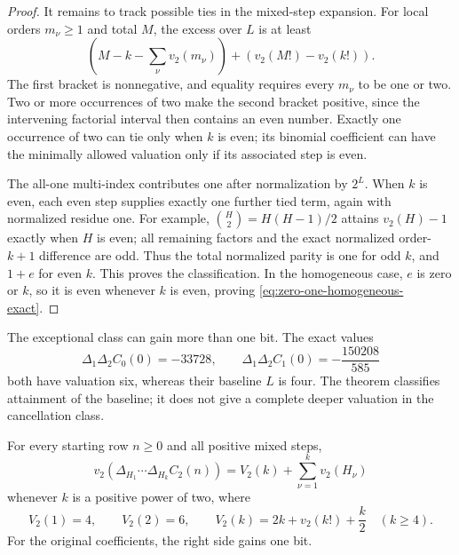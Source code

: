 \begin{proof}
It remains to track possible ties in the mixed-step expansion.
For local orders $m_\nu\geq1$ and total $M$, the excess over $L$ is
at least
\begin{equation}
 \left(M-k-\sum_\nu v_2(m_\nu)\right)
                       +\left(v_2(M!)-v_2(k!)\right).
 \label{eq:zero-one-mixed-excess}
\end{equation}
The first bracket is nonnegative, and equality requires every
$m_\nu$ to be one or two. Two or more occurrences of two make the
second bracket positive, since the intervening factorial interval then
contains an even number. Exactly one occurrence of two can tie only
when $k$ is even; its binomial coefficient can have the minimally
allowed valuation only if its associated step is even.

The all-one multi-index contributes one after normalization by $2^L$.
When $k$ is even, each even step supplies exactly one further tied term,
again with normalized residue one. For example,
$\binom H2=H(H-1)/2$ attains $v_2(H)-1$ exactly when $H$ is even;
all remaining factors and the exact normalized order-$k+1$ difference
are odd. Thus the total normalized parity is one for odd $k$, and
$1+e$ for even $k$. This proves the classification.
In the homogeneous case, $e$ is zero or $k$, so it is even whenever
$k$ is even, proving \eqref{eq:zero-one-homogeneous-exact}.
\end{proof}

\begin{remark}
The exceptional class can gain more than one bit. The exact values
\[
 \Delta_1\Delta_2C_0(0)=-33728,\qquad
 \Delta_1\Delta_2C_1(0)=-\frac{150208}{585}
\]
both have valuation six, whereas their baseline $L$ is four.
The theorem classifies attainment of the baseline; it does not give a
complete deeper valuation in the cancellation class.
\end{remark}

\begin{theorem}
\label{thm:two-exact-power-orders}
For every starting row $n\geq0$ and all positive mixed steps,
\begin{equation}
 v_2(\Delta_{H_1}\cdots\Delta_{H_k}C_2(n))
       =V_2(k)+\sum_{\nu=1}^k v_2(H_\nu)
 \label{eq:two-power-orders-exact}
\end{equation}
whenever $k$ is a positive power of two, where
\[
 V_2(1)=4,\qquad V_2(2)=6,\qquad
 V_2(k)=2k+v_2(k!)+\frac{k}{2}\quad(k\geq4).
\]
For the original coefficients, the right side gains one bit.
\end{theorem}

